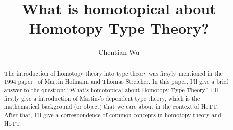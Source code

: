 \documentclass[12pt]{amsart}
\title{What is homotopical about Homotopy Type Theory?}
\author{Chentian Wu}
\date{}
\begin{document}
\maketitle

\begin{abstract}
  The introduction of homotopy theory into type theory was firsyly mentioned in the  1994 paper~\cite{hofmann1994groupoid} of Martin Hofmann and Thomas Streicher.
  In this paper, I'll give a brief answer to the question: ``What's homotopical about Homotopy Type Theory''.
  I'll firstly give a introduction of Martin-\Lof's dependent type theory, which is the mathematical background (or object) that we care about in the context of HoTT.
  After that, I'll give a correspondence of common concepts in homotopy theory and HoTT.
\end{abstract}

\tableofcontents







\end{document}
